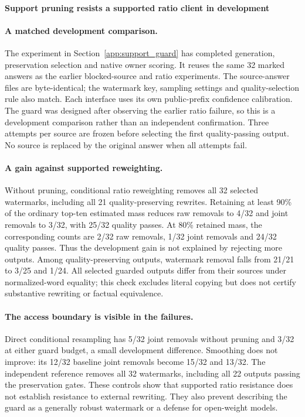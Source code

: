 \paragraph{Support pruning resists a supported ratio client in development}
\label{sec:support_guard_results}
\paragraph{A matched development comparison.}
The experiment in Section~\ref{app:support_guard} has completed generation, preservation selection and native owner scoring. It reuses the same 32 marked answers as the earlier blocked-source and ratio experiments. The source-answer files are byte-identical; the watermark key, sampling settings and quality-selection rule also match. Each interface uses its own public-prefix confidence calibration. The guard was designed after observing the earlier ratio failure, so this is a development comparison rather than an independent confirmation. Three attempts per source are frozen before selecting the first quality-passing output. No source is replaced by the original answer when all attempts fail.



\paragraph{A gain against supported reweighting.}
Without pruning, conditional ratio reweighting removes all 32 selected watermarks, including all 21 quality-preserving rewrites. Retaining at least 90\% of the ordinary top-ten estimated mass reduces raw removals to 4/32 and joint removals to 3/32, with 25/32 quality passes. At 80\% retained mass, the corresponding counts are 2/32 raw removals, 1/32 joint removals and 24/32 quality passes. Thus the development gain is not explained by rejecting more outputs. Among quality-preserving outputs, watermark removal falls from 21/21 to 3/25 and 1/24. All selected guarded outputs differ from their sources under normalized-word equality; this check excludes literal copying but does not certify substantive rewriting or factual equivalence.

\paragraph{The access boundary is visible in the failures.}
Direct conditional resampling has 5/32 joint removals without pruning and 3/32 at either guard budget, a small development difference. Smoothing does not improve: its 12/32 baseline joint removals become 15/32 and 13/32. The independent reference removes all 32 watermarks, including all 22 outputs passing the preservation gates. These controls show that supported ratio resistance does not establish resistance to external rewriting. They also prevent describing the guard as a generally robust watermark or a defense for open-weight models.

